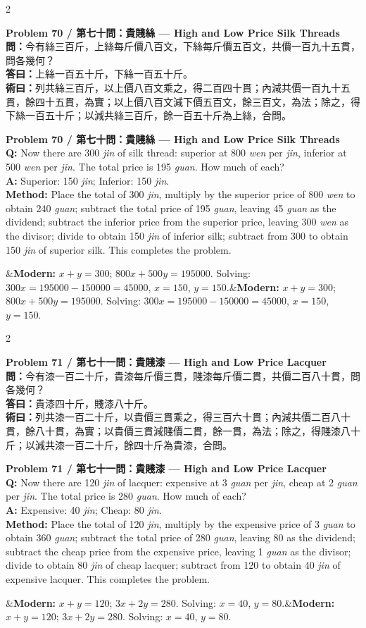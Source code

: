 \documentclass[11pt,a4paper]{article}
\newcommand{\bilingualproblem}[4]{%
  \begin{paracol}{2}
  \begin{leftcolumn}
  \noindent\textbf{\color{problemcolor}#1}\\[0.2cm]
  #2
  \end{leftcolumn}
  \switchcolumn
  \noindent\textbf{\color{problemcolor}#1}\\[0.2cm]
  #3
  \end{paracol}
  \ifx&#4&\else\vspace{0.3cm}\noindent#4\fi
  \vspace{0.5cm}
}
\newcommand{\wen}[1]{\textcolor{problemcolor}{\textbf{問：}}#1}
\newcommand{\da}[1]{\textcolor{answercolor}{\textbf{答曰：}}#1}
\newcommand{\shu}[1]{\textcolor{methodcolor}{\textbf{術曰：}}#1}
\newcommand{\wenen}[1]{\textcolor{problemcolor}{\textbf{Q:}} #1}
\newcommand{\daen}[1]{\textcolor{answercolor}{\textbf{A:}} #1}
\newcommand{\shuen}[1]{\textcolor{methodcolor}{\textbf{Method:}} #1}
\begin{document}
\bilingualproblem{Problem 70 / 第七十問：貴賤絲 --- High and Low Price Silk Threads}{
\wen{今有絲三百斤，上絲每斤價八百文，下絲每斤價五百文，共價一百九十五貫，問各幾何？}\\[0.2cm]
\da{上絲一百五十斤，下絲一百五十斤。}\\[0.2cm]
\shu{列共絲三百斤，以上價八百文乘之，得二百四十貫；內減共價一百九十五貫，餘四十五貫，為實；以上價八百文減下價五百文，餘三百文，為法；除之，得下絲一百五十斤；以減共絲三百斤，餘一百五十斤為上絲，合問。}
}{
\wenen{Now there are 300 \textit{jin} of silk thread: superior at 800 \textit{wen} per \textit{jin}, inferior at 500 \textit{wen} per \textit{jin}. The total price is 195 \textit{guan}. How much of each?}\\[0.2cm]
\daen{Superior: 150 \textit{jin}; Inferior: 150 \textit{jin}.}\\[0.2cm]
\shuen{Place the total of 300 \textit{jin}, multiply by the superior price of 800 \textit{wen} to obtain 240 \textit{guan}; subtract the total price of 195 \textit{guan}, leaving 45 \textit{guan} as the dividend; subtract the inferior price from the superior price, leaving 300 \textit{wen} as the divisor; divide to obtain 150 \textit{jin} of inferior silk; subtract from 300 to obtain 150 \textit{jin} of superior silk. This completes the problem.}
}{\textbf{Modern:} $x + y = 300$; $800x + 500y = 195000$. Solving: $300x = 195000 - 150000 = 45000$, $x = 150$, $y = 150$.}

\bilingualproblem{Problem 71 / 第七十一問：貴賤漆 --- High and Low Price Lacquer}{
\wen{今有漆一百二十斤，貴漆每斤價三貫，賤漆每斤價二貫，共價二百八十貫，問各幾何？}\\[0.2cm]
\da{貴漆四十斤，賤漆八十斤。}\\[0.2cm]
\shu{列共漆一百二十斤，以貴價三貫乘之，得三百六十貫；內減共價二百八十貫，餘八十貫，為實；以貴價三貫減賤價二貫，餘一貫，為法；除之，得賤漆八十斤；以減共漆一百二十斤，餘四十斤為貴漆，合問。}
}{
\wenen{Now there are 120 \textit{jin} of lacquer: expensive at 3 \textit{guan} per \textit{jin}, cheap at 2 \textit{guan} per \textit{jin}. The total price is 280 \textit{guan}. How much of each?}\\[0.2cm]
\daen{Expensive: 40 \textit{jin}; Cheap: 80 \textit{jin}.}\\[0.2cm]
\shuen{Place the total of 120 \textit{jin}, multiply by the expensive price of 3 \textit{guan} to obtain 360 \textit{guan}; subtract the total price of 280 \textit{guan}, leaving 80 as the dividend; subtract the cheap price from the expensive price, leaving 1 \textit{guan} as the divisor; divide to obtain 80 \textit{jin} of cheap lacquer; subtract from 120 to obtain 40 \textit{jin} of expensive lacquer. This completes the problem.}
}{\textbf{Modern:} $x + y = 120$; $3x + 2y = 280$. Solving: $x = 40$, $y = 80$.}
\end{document}
